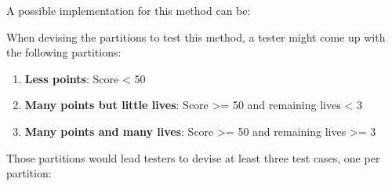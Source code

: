 A possible implementation for this method can be:

\begin{Shaded}
\begin{Highlighting}[]
 

    \NormalTok{(}
    \NormalTok{)}
      \NormalTok{;}

    \NormalTok{;}
\NormalTok{  \}}
\NormalTok{\}}
\end{Highlighting}
\end{Shaded}

When devising the partitions to test this method, a tester might come up
with the following partitions:

\begin{enumerate}
\def\labelenumi{\arabic{enumi}.}
\tightlist
\item
  \textbf{Less points}: Score \textless{} 50
\item
  \textbf{Many points but little lives}: Score \textgreater= 50 and
  remaining lives \textless{} 3
\item
  \textbf{Many points and many lives}: Score \textgreater= 50 and
  remaining lives \textgreater= 3
\end{enumerate}

Those partitions would lead testers to devise at least three test cases,
one per partition:

